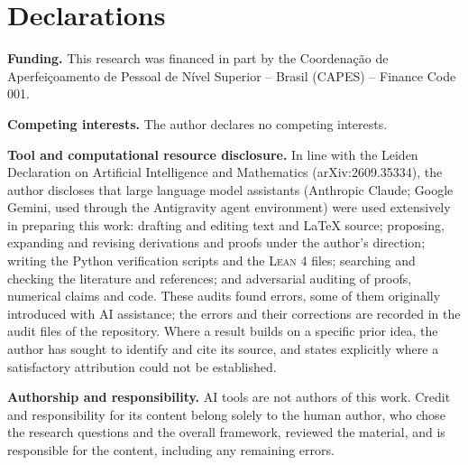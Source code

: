 \providecommand{\gtqgdeclscope}{chapter}
\section*{Declarations}

\noindent\textbf{Funding.} This research was financed in part by the Coordena\c{c}\~ao de Aperfei\c{c}oamento de Pessoal de N\'ivel Superior -- Brasil (CAPES) -- Finance Code 001.

\medskip\noindent\textbf{Competing interests.} The author declares no competing interests.

\medskip\noindent\textbf{Tool and computational resource disclosure.} In line with the Leiden Declaration on Artificial Intelligence and Mathematics (arXiv:2609.35334), the author discloses that large language model assistants (Anthropic Claude; Google Gemini, used through the Antigravity agent environment) were used extensively in preparing this work: drafting and editing text and \LaTeX{} source; proposing, expanding and revising derivations and proofs under the author's direction; writing the Python verification scripts and the \textsc{Lean 4} files; searching and checking the literature and references; and adversarial auditing of proofs, numerical claims and code. These audits found errors, some of them originally introduced with AI assistance; the errors and their corrections are recorded in the audit files of the repository. Where a result builds on a specific prior idea, the author has sought to identify and cite its source, and states explicitly where a satisfactory attribution could not be established.

\medskip\noindent\textbf{Authorship and responsibility.} AI tools are not authors of this work. Credit and responsibility for its content belong solely to the human author, who chose the research questions and the overall framework, reviewed the material, and is responsible for the content, including any remaining errors.

